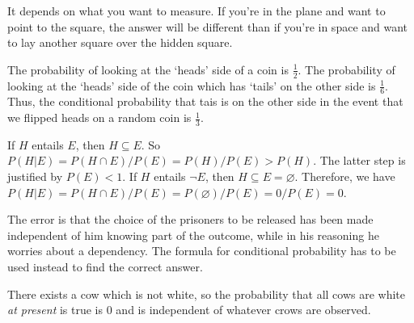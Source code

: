 \documentclass{article}
\begin{document}
\begin{ex}
It depends on what you want to measure. If you're in the plane and want to point to the square, the answer will be different than if you're in space and want to lay another square over the hidden square.
\end{ex}

\setcounter{ex}{0}

\begin{ex}
The probability of looking at the `heads' side of a coin is $\frac{1}{2}$. The probability of looking at the `heads' side of the coin which has `tails' on the other side is $\frac{1}{6}$. Thus, the conditional probability that tais is on the other side in the event that  we flipped heads on a random coin is $\frac{1}{3}$.
\end{ex}

\begin{ex}
If $H$ entails $E$, then $H\subseteq E$. So $P(H|E)=P(H\cap E)/P(E)=P(H)/P(E)>P(H)$. The latter step is justified by $P(E)<1$. If $H$ entails $\neg E$, then $H\subseteq E=\varnothing$. Therefore, we have $P(H|E)=P(H\cap E)/P(E)=P(\varnothing)/P(E)=0/P(E)=0$.
\end{ex}

\begin{ex}
The error is that the choice of the prisoners to be released has been made independent of him knowing part of the outcome, while in his reasoning he worries about a dependency. The formula for conditional probability has to be used instead to find the correct answer.
\end{ex}

\begin{ex}
There exists a cow which is not white, so the probability that all cows are white \emph{at present} is true is $0$ and is independent of whatever crows are observed.
\end{ex}
\end{document}
